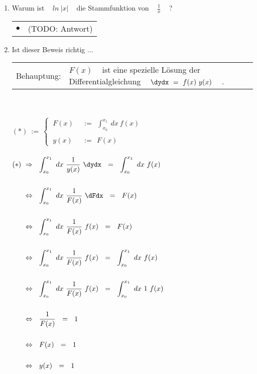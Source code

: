\begin{enumerate}
	
	\newpage
	
	
	\item Warum ist ~ $ln ~ \left| x \right|$ ~ die Stammfunktion von ~ $\frac{1}{x}$ ~ ? \\
	
	\begin{tabularx}{0.88\textwidth}{lX}
		$\bullet$ & (TODO: Antwort)
	\end{tabularx}
	
	
	\newpage
	
	
	\item Ist dieser Beweis richtig  ... ~\\
	
	\begin{tabularx}{0.88\textwidth}{lX}
		Behauptung: & $F(x)$ ~ ist eine spezielle Lösung der Differentialgleichung ~ $\dydx ~ = ~ f(x) ~ y(x)$ ~ .
	\end{tabularx}
	 
	~\\
	~\\
	
	$ (*) ~ := ~ \begin{cases}
	~ F(x) ~~ &:= ~~ \int_{x_0}^{x_1} ~ dx ~ f(x) \\ \\
	~ y(x) ~~ &:= ~~ F(x)
	\end{cases}$ \\
	
	~\\
	
	$\begin{aligned}[t]
	(*) ~ &\Rightarrow ~~ \int_{x_0}^{x_1} ~ dx ~ \frac{1}{y(x)} ~ \dydx ~~ = ~~ \int_{x_0}^{x_1} ~ dx ~ f(x) \\ \\
	&\Leftrightarrow ~~ \int_{x_0}^{x_1} ~ dx ~ \frac{1}{F(x)} ~ \dFdx ~~ = ~~ F(x) \\ \\
	&\Leftrightarrow ~~ \int_{x_0}^{x_1} ~ dx ~ \frac{1}{F(x)} ~ f(x) ~~ = ~~ F(x) \\ \\
	&\Leftrightarrow ~~ \int_{x_0}^{x_1} ~ dx ~ \frac{1}{F(x)} ~ f(x) ~~ = ~~ \int_{x_0}^{x_1} ~ dx ~ f(x) \\ \\
	&\Leftrightarrow ~~ \int_{x_0}^{x_1} ~ dx ~ \frac{1}{F(x)} ~ f(x) ~~ = ~~ \int_{x_0}^{x_1} ~ dx ~ 1 ~ f(x) \\ \\
	&\Leftrightarrow ~~ \frac{1}{F(x)} ~~ = ~~ 1\\ \\
	&\Leftrightarrow ~~ F(x) ~~ = ~~ 1 \\ \\
	&\Leftrightarrow ~~ y(x) ~~ = ~~ 1
	\end{aligned}$
	

\end{enumerate}
